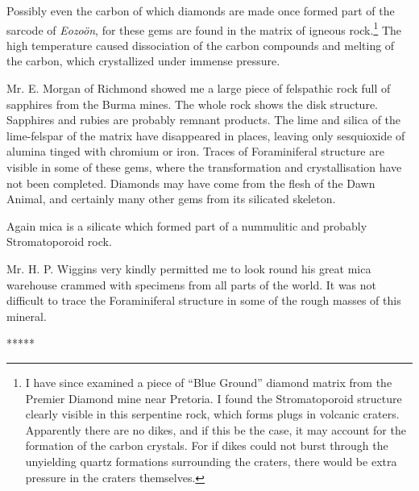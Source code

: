 \documentclass[a4paper, 12pt, oneside]{article}
\begin{document}
Possibly even the carbon of which diamonds are made once formed part of the sarcode of \emph{Eozoön}, for these gems are found in the matrix of igneous rock.\footnote{I have since examined a piece of ``Blue Ground'' diamond matrix from the Premier Diamond mine near Pretoria. I found the Stromatoporoid structure clearly visible in this serpentine rock, which forms plugs in volcanic craters.\\
\hspace*{5mm}Apparently there are no dikes, and if this be the case, it may account for the formation of the carbon crystals. For if dikes could not burst through the unyielding quartz formations surrounding the craters, there would be extra pressure in the craters themselves.} The high temperature caused dissociation of the carbon compounds and melting of the carbon, which crystallized under immense pressure.

Mr. E. Morgan of Richmond showed me a large piece of felspathic rock full of sapphires from the Burma mines. The whole rock shows the disk structure. Sapphires and rubies are probably remnant products. The lime and silica of the lime-felspar of the matrix have disappeared in places, leaving only sesquioxide of alumina tinged with chromium or iron. Traces of Foraminiferal structure are visible in some of these gems, where the transformation and crystallisation have not been completed. Diamonds may have come from the flesh of the Dawn Animal, and certainly many other gems from its silicated skeleton.

Again mica is a silicate which formed part of a nummulitic and probably Stromatoporoid rock.

Mr. H. P. Wiggins very kindly permitted me to look round his great mica warehouse crammed with specimens from all parts of the world. It was not difficult to trace the Foraminiferal structure in some of the rough masses of this mineral.

\centerline{*\hspace{15mm}*\hspace{15mm}*\hspace{15mm}*\hspace{15mm}*}
\bigskip
\end{document}
